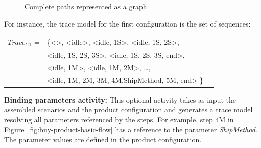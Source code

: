 \documentclass{acm_proc_article-sp}
\begin{document}
 
\begin{figure}[t]
\begin{center}
\begin{tiny}
\begin{xy}
\end{xy}
\end{tiny}
\caption{Complete paths represented  as a graph}
\label{fig:complete-paths}
\end{center}
\end{figure}

For instance, the trace model for the first configuration is the set of sequences:

\begin{small}
\begin{tabular}{rlc}
$Trace_{C1}$ = & \{<>, <idle>, <idle, 1S>, <idle, 1S, 2S>, \\ 
                    & <idle, 1S, 2S, 3S>,  <idle, 1S, 2S, 3S, end>, \\ 
                    & <idle, 1M>, <idle, 1M, 2M>, \ldots, \\ 
                    & <idle, 1M, 2M, 3M, 4M.ShipMethod, 5M, end> \}
\end{tabular}
\end{small}
 
{\bf Binding parameters activity:}  This optional activity takes as input the assembled scenarios and the product configuration and generates 
 a trace model resolving all parameters referenced by the steps. For example, step 4M in Figure~\ref{fig:buy-product-basic-flow} has a reference 
 to the parameter \emph{ShipMethod}. The parameter values are defined in the product configuration.
 
\end{document}
